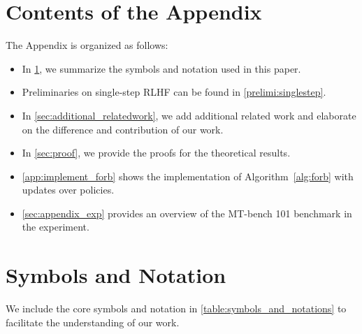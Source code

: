 \newpage
\appendix
\onecolumn
\section*{Contents of the Appendix}
The Appendix is organized as follows:
\begin{itemize}[leftmargin=*]
  \vspace{-0.5em}
\item
    In \cref{sec:appendix_symbol}, we summarize the symbols and notation used in this paper.
\item Preliminaries on single-step RLHF can be found in \cref{prelimi:singlestep}.
\item In \cref{sec:additional_relatedwork}, we add additional related work and elaborate on the difference and contribution of our work. 
\item In \cref{sec:proof}, we provide the proofs for the theoretical results.
\item \cref{app:implement_forb} shows the implementation of Algorithm~\ref{alg:forb} with updates over policies.
\item \cref{sec:appendix_exp} provides an overview of the MT-bench 101 benchmark in the experiment.
\end{itemize}

\section{Symbols and Notation}
\label{sec:appendix_symbol}
We include the core symbols and notation in \cref{table:symbols_and_notations} to facilitate the understanding of our work.

